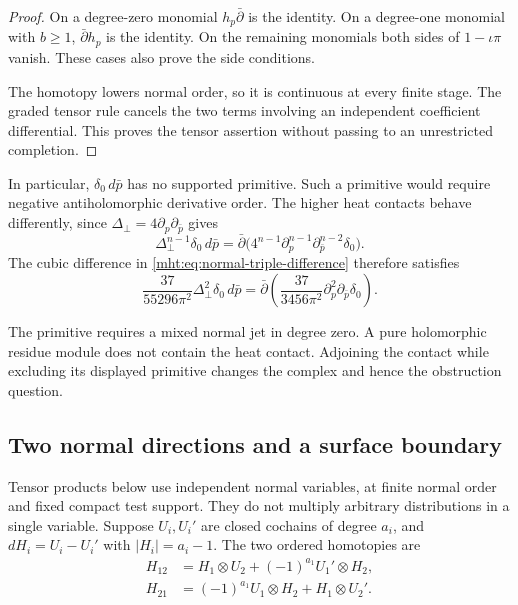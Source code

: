 \begin{proof}
On a degree-zero monomial $h_p\bar\partial$ is the identity.
On a degree-one monomial with $b\geq1$, $\bar\partial h_p$ is the
identity. On the remaining monomials both sides of $1-\iota\pi$
vanish. These cases also prove the side conditions.

The homotopy lowers normal order, so it is continuous at every
finite stage. The graded tensor rule cancels the two terms
involving an independent coefficient differential. This proves
the tensor assertion without passing to an unrestricted completion.
\end{proof}

In particular, $\delta_0\,d\bar p$ has no supported primitive.
Such a primitive would require negative antiholomorphic derivative
order. The higher heat contacts behave differently, since
$\Delta_\perp=4\partial_p\partial_{\bar p}$ gives
\begin{equation}\label{mht:eq:dolbeault-contact-primitive}
 \Delta_\perp^{n-1}\delta_0\,d\bar p
 =\bar\partial\bigl(
   4^{n-1}\partial_p^{n-1}\partial_{\bar p}^{n-2}\delta_0\bigr).
\end{equation}
The cubic difference in \eqref{mht:eq:normal-triple-difference}
therefore satisfies
\begin{equation}\label{mht:eq:cubic-contact-primitive}
 \frac{37}{55296\pi^2}\Delta_\perp^2\delta_0\,d\bar p
 =\bar\partial\left(
    \frac{37}{3456\pi^2}\partial_p^2\partial_{\bar p}\delta_0\right).
\end{equation}

The primitive requires a mixed normal jet in degree zero.
A pure holomorphic residue module does not contain the heat contact.
Adjoining the contact while excluding its displayed primitive
changes the complex and hence the obstruction question.

\subsection{Two normal directions and a surface boundary}

Tensor products below use independent normal variables, at finite
normal order and fixed compact test support. They do not multiply
arbitrary distributions in a single variable. Suppose $U_i,U_i'$
are closed cochains of degree $a_i$, and
$dH_i=U_i-U_i'$ with $|H_i|=a_i-1$. The two ordered homotopies are
\begin{align*}
 H_{12}&=H_1\otimes U_2+(-1)^{a_1}U_1'\otimes H_2,\\
 H_{21}&=(-1)^{a_1}U_1\otimes H_2+H_1\otimes U_2'.
\end{align*}

